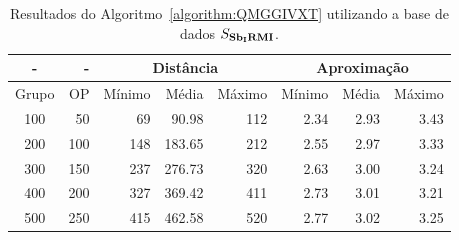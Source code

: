 \begin{table}[!htb]
  \caption{Resultados do Algoritmo~\ref{algorithm:QMGGIVXT} utilizando a base de dados $S_{\textbf{Sb\textsubscript{I}RMI}}{}$.}
  \label{table:GITKWJXD}
  \centering
  \begin{tabular}{|c|r|r|r|r|r|r|r|}
    \hline
      -      &  -   & \multicolumn{3}{c|}{Distância}             & \multicolumn{3}{c|}{Aproximação}           \\ \hline
    Grupo    & OP   & Mínimo       & Média        & Máximo       & Mínimo       & Média        & Máximo       \\ \hline  
    100      & 50   & 69           &  90.98       & 112          & 2.34         & 2.93         & 3.43         \\ \hline
    200      & 100  & 148          & 183.65       & 212          & 2.55         & 2.97         & 3.33         \\ \hline
    300      & 150  & 237          & 276.73       & 320          & 2.63         & 3.00         & 3.24         \\ \hline
    400      & 200  & 327          & 369.42       & 411          & 2.73         & 3.01         & 3.21         \\ \hline
    500      & 250  & 415          & 462.58       & 520          & 2.77         & 3.02         & 3.25         \\ \hline    
  \end{tabular}
\end{table}